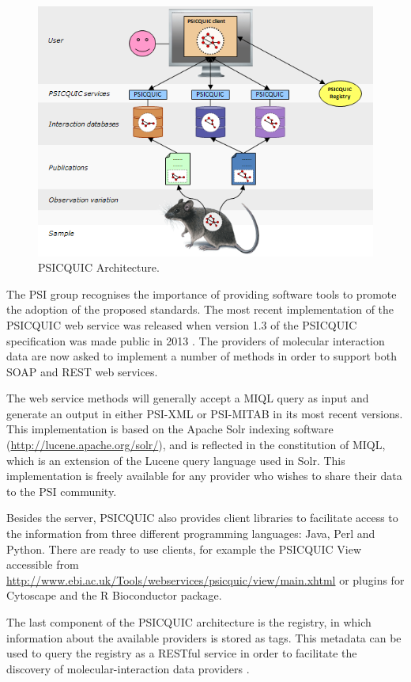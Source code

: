 \begin{figure}  
\centering
\includegraphics[width=4.5in]{figures/psicquic.png}
\caption[PSICQUIC Architecture.]{PSICQUIC Architecture.
\label{fig:psicquic}}
\end{figure}

The PSI group recognises the importance of providing software tools to promote the adoption of the proposed standards. The most recent implementation of the PSICQUIC web service was released when version 1.3 of the PSICQUIC specification was made public in 2013 \cite{DEL2013}. The providers of molecular interaction data are now asked to implement a number of methods in order to support both SOAP and REST web services. 

The web service methods will generally accept a MIQL query as input and generate an output in either PSI-XML or PSI-MITAB in its most recent versions. This implementation is based on the Apache Solr indexing software (\url{http://lucene.apache.org/solr/}), and is reflected in the constitution of MIQL, which is an extension of the Lucene query language used in Solr. This implementation is freely available for any provider who wishes to share their data to the PSI community.

Besides the server, PSICQUIC also provides client libraries to facilitate access to the information from three different programming languages: Java, Perl and Python. There are ready to use clients, for example the PSICQUIC View accessible from \url{http://www.ebi.ac.uk/Tools/webservices/psicquic/view/main.xhtml} or plugins for Cytoscape and the R Bioconductor package.

The last component of the PSICQUIC architecture is the registry, in which information about the available providers is stored as tags. This metadata can be used to query the registry as a RESTful service in order to facilitate the discovery of molecular-interaction data providers \cite{DEL2013}.


